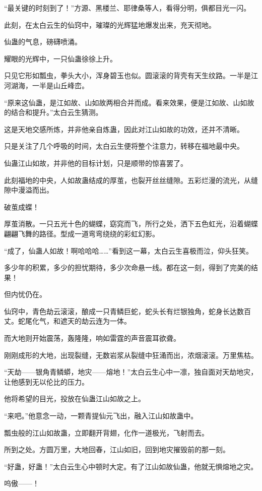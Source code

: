 \begin{this_body}
“最关键的时刻到了！”方源、黑楼兰、耶律桑等人，看得分明，俱都目光一闪。

此刻，在太白云生的仙窍中，璀璨的光辉猛地爆发出来，充天彻地。

仙蛊的气息，磅礴喷涌。

耀眼的光辉中，一只仙蛊徐徐上升。

只见它形如瓢虫，拳头大小，浑身碧玉也似。圆滚滚的背壳有天生纹路。一半是江河湖海，一半是山丘峰峦。

“原来这仙蛊，是江如故、山如故两相合并而成。看来效果，便是江如故、山如故的结合和提升。”太白云生猜测。

这是天地交感所炼，并非他亲自炼蛊，因此对江山如故的功效，还并不清晰。

只是关注了几个呼吸的时间，太白云生便将整个注意力，转移在福地最中央。

仙蛊江山如故，并非他的目标计划，只是顺带的惊喜罢了。

此刻福地的中央，人如故蛊结成的厚茧，也裂开丝丝缝隙。五彩烂漫的流光，从缝隙中漫溢而出。

破茧成蝶！

厚茧消散。一只五光十色的蝴蝶，窈窕而飞，所行之处，洒下五色虹光，沿着蝴蝶翩翩飞舞的路径。型成一道弯弯绕绕的彩虹幻影。

“成了，仙蛊人如故！啊哈哈哈……”看到这一幕，太白云生喜极而泣，仰头狂笑。

多少年的积累，多少的担忧期待，多少次命悬一线。都在这一刻，得到了完美的结果！

但内忧仍在。

仙窍中，青色劫云滚滚，酿成一只青鳞巨蛇，蛇头长有烂银独角，蛇身长达数百丈。蛇尾化气，和遮天的劫云连为一体。

而大地则开始震荡，轰隆隆，响如雷霆的声音震耳欲聋。

刚刚成形的大地，出现裂缝，无数岩浆从裂缝中狂涌而出，浓烟滚滚。万里焦枯。

“天劫——银角青鳞蟒，地灾——熔地！”太白云生心中一凛，独自面对天劫地灾，让他感到无以伦比的压力。

他将希望的目光，投放在仙蛊江山如故之上。

“来吧。”他意念一动，一颗青提仙元飞出，融入江山如故蛊中。

瓢虫般的江山如故蛊，立即翻开背翅，化作一道极光，飞射而去。

所到之处。方圆万里，大地回春，江山如旧，回到地灾摧毁前的那一刻。

“好蛊，好蛊！”太白云生心中顿时大定。有了江山如故仙蛊，他就无惧熔地之灾。

呜傲——！


\end{this_body}
